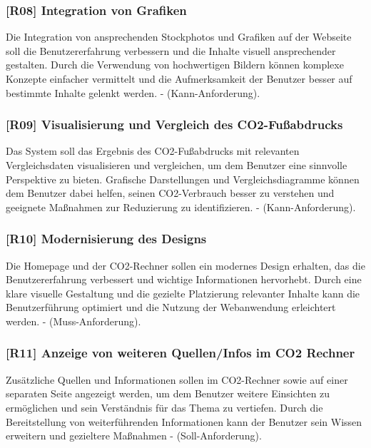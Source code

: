 \subsubsection{[R08] Integration von Grafiken}

Die Integration von ansprechenden Stockphotos und Grafiken auf der Webseite soll die Benutzererfahrung verbessern und die Inhalte visuell ansprechender gestalten. Durch die Verwendung von hochwertigen Bildern können komplexe Konzepte einfacher vermittelt und die Aufmerksamkeit der Benutzer besser auf bestimmte Inhalte gelenkt werden. - (Kann-Anforderung).

\subsubsection{[R09] Visualisierung und Vergleich des CO2-Fußabdrucks}

Das System soll das Ergebnis des CO2-Fußabdrucks mit relevanten Vergleichsdaten visualisieren und vergleichen, um dem Benutzer eine sinnvolle Perspektive zu bieten. Grafische Darstellungen und Vergleichsdiagramme können dem Benutzer dabei helfen, seinen CO2-Verbrauch besser zu verstehen und geeignete Maßnahmen zur Reduzierung zu identifizieren. - (Kann-Anforderung).

\subsubsection{[R10] Modernisierung des Designs}

Die Homepage und der CO2-Rechner sollen ein modernes Design erhalten, das die Benutzererfahrung verbessert und wichtige Informationen hervorhebt. Durch eine klare visuelle Gestaltung und die gezielte Platzierung relevanter Inhalte kann die Benutzerführung optimiert und die Nutzung der Webanwendung erleichtert werden. - (Muss-Anforderung).

\subsubsection{[R11] Anzeige von weiteren Quellen/Infos im CO2 Rechner}

Zusätzliche Quellen und Informationen sollen im CO2-Rechner sowie auf einer separaten Seite angezeigt werden, um dem Benutzer weitere Einsichten zu ermöglichen und sein Verständnis für das Thema zu vertiefen. Durch die Bereitstellung von weiterführenden Informationen kann der Benutzer sein Wissen erweitern und gezieltere Maßnahmen - (Soll-Anforderung).

